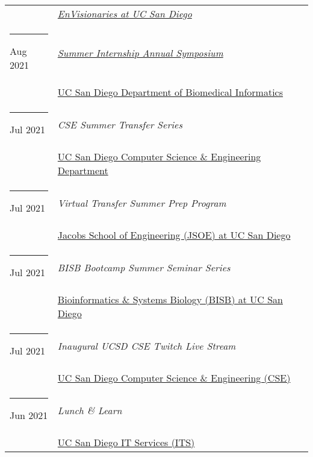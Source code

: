 \documentclass[margin,line]{res}
\begin{document}
\begin{resume}
\begin{longtable}{@{}p{0.7in}p{4in}}
\hspace*{-4mm} & \hspace{4mm} \href{https://www.facebook.com/envisionariesUCSD/}{\textit{EnVisionaries at UC San Diego}}\\
\hspace*{-4mm} \rule{-1mm}{5mm} Aug 2021 & \href{https://dbmi.ucsd.edu/education/internships/index.html}{\textit{Summer Internship Annual Symposium}}\\*
\hspace*{-4mm} & \hspace{4mm} \href{https://dbmi.ucsd.edu/}{UC San Diego Department of Biomedical Informatics}\\
\hspace*{-4mm} \rule{-1mm}{5mm} Jul 2021 & \textit{CSE Summer Transfer Series}\\*
\hspace*{-4mm} & \hspace{4mm} \href{https://cse.ucsd.edu/}{UC San Diego Computer Science \& Engineering Department}\\
\hspace*{-4mm} \rule{-1mm}{5mm} Jul 2021 & \textit{Virtual Transfer Summer Prep Program}\\*
\hspace*{-4mm} & \hspace{4mm} \href{https://jacobsschool.ucsd.edu/}{Jacobs School of Engineering (JSOE) at UC San Diego}\\
\hspace*{-4mm} \rule{-1mm}{5mm} Jul 2021 & \textit{BISB Bootcamp Summer Seminar Series}\\*
\hspace*{-4mm} & \hspace{4mm} \href{https://bioinformatics.ucsd.edu/}{Bioinformatics \& Systems Biology (BISB) at UC San Diego}\\
\hspace*{-4mm} \rule{-1mm}{5mm} Jul 2021 & \textit{Inaugural UCSD CSE Twitch Live Stream}\\*
\hspace*{-4mm} & \hspace{4mm} \href{https://cse.ucsd.edu/}{UC San Diego Computer Science \& Engineering (CSE)}\\
\hspace*{-4mm} \rule{-1mm}{5mm} Jun 2021 & \textit{Lunch \& Learn}\\*
\hspace*{-4mm} & \hspace{4mm} \href{https://its.ucsd.edu}{UC San Diego IT Services (ITS)}\\

\end{longtable}
\end{resume}
\end{document}
